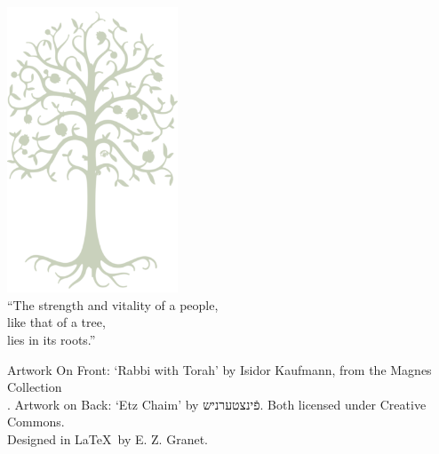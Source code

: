 \documentclass[10pt,twoside]{article}
\begin{document}
\clearpage



\vspace{1in}

\begin{center}
    \includegraphics[height=8.5cm]{etz3.png}
\\\vspace{0.5in}
\calligra\Large``The strength and vitality of a people,\\ like that of a tree,\\ lies in its roots.''
\vspace{1in}

\normalfont\scriptsize Artwork On Front: `Rabbi with Torah' by Isidor Kaufmann, from the Magnes Collection\\. Artwork on Back: `Etz Chaim' by \ttfamily\foreignlanguage{hebrew}{פֿינצטערניש}\normalfont. Both licensed under Creative Commons.\\
Designed in \LaTeX\ by E. Z. Granet.
\end{center}
\end{document}
